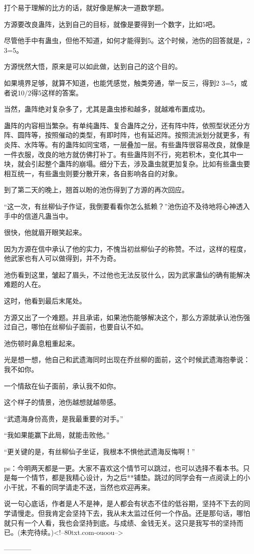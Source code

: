 \begin{this_body}
打个易于理解的比方的话，就好像是解决一道数学题。

方源要改良蛊阵，达到自己的目标，就像是要得到一个数字，比如5吧。

尽管他手中有蛊虫，但他不知道，如何才能得到5。这个时候，池伤的回答就是，2 3=5。

方源恍然大悟，原来是可以如此做，达到自己的这个目的。

如果境界足够，就算不知道，也能凭感觉，触类旁通，举一反三，得到2 3=5，或者说10/2得5这样的答案。

当然，蛊阵绝对复杂多了，尤其是蛊虫掺和越多，就越难布置成功。

蛊阵的内容相当繁杂。有单纯蛊阵、复合蛊阵之分，还有阵中阵，依照型状还分方阵、圆阵等，按照催动的类型，有即时阵，也有延迟阵。按照流派划分就更多，有炎阵、水阵等。有的蛊阵如同宝塔，一层叠加一层。有些蛊阵很容易改良，就像是一件衣服，改良的地方就仿佛打补丁。有些蛊阵则不行，宛若积木，变化其中一块，就会引起整个蛊阵的崩塌。细分下去，涉及蛊虫就更加复杂。比如有些蛊虫要相互统一，有些蛊虫则要分散开来，各自影响各自的对象。

到了第二天的晚上，翘首以盼的池伤得到了方源的再次回应。

“这一次，有丝柳仙子作证，我倒要看看你怎么抵赖？”池伤迫不及待地将心神透入手中的信道凡蛊当中。

很快，他就眉开眼笑起来。

因为方源在信中承认了他的实力，不愧当初丝柳仙子的称赞。不过，这样的程度，他武家也有人可以做得到，并不为奇。

池伤看到这里，皱起了眉头，不过他也无法反驳什么，因为武家蛊仙的确有能解决难题的人在。

这时，他看到最后末尾处。

方源又出了一个难题。并且承诺，如果池伤能够解决这个，那么方源就承认池伤强过自己，哪怕在丝柳仙子面前，也要自认不如。

池伤顿时鼻息粗重起来。

光是想一想，他自己和武遗海同时出现在乔丝柳的面前，这个时候武遗海抱拳说：我不如你。

一个情敌在仙子面前，承认我不如你。

这个样子的情景，池伤越想就越带感。

“武遗海身份高贵，是我最重要的对手。”

“我如果能赢下此局，就能击败他。”

“更关键的是，有丝柳仙子坐证，我根本不惧他武遗海反悔啊！”

ps：今明两天都是一更。大家不喜欢这个情节可以跳过，也可以选择不看本书。只是每一个情节，都是我精心设计，为之后**铺垫。跳过的同学会有一点阅读上的小小干扰，不看的同学请走不送，当然也欢迎再来。

说一句心底话，作者是人不是神，是人都会有状态不佳的低谷期，坚持不下去的同学请慢走。但我肯定会坚持下去，我从未太监过任何一个作品。还是那句话，哪怕就只有一个人看，我也会坚持到底。与成绩、金钱无关。这只是我写书的坚持而已。(未完待续。)<!--80txt.com-ouoou-->

------------

\end{this_body}

